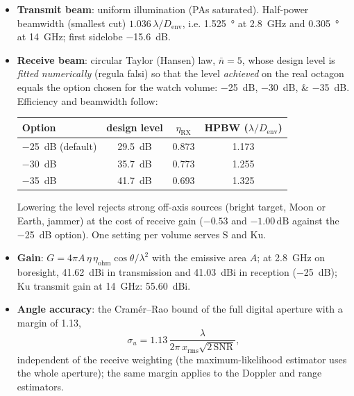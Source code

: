 \documentclass[11pt,a4paper]{article}
\newcommand{\dB}{\,\mathrm{dB}}
\newcommand{\SNR}{\mathrm{SNR}}
\newcommand{\Denv}{D_{\mathrm{env}}}
\begin{document}
\begin{itemize}
  \item \textbf{Transmit beam}: uniform illumination (PAs saturated). Half-power beamwidth (smallest cut)
        $1.036\,\lambda/\Denv$, i.e. \SI{1.525}{\degree} at \SI{2.8}{GHz} and \SI{0.305}{\degree} at \SI{14}{GHz};
        first sidelobe \SI{-15.6}{dB}.
  \item \textbf{Receive beam}: circular Taylor (Hansen) law, $\bar n = 5$, whose design level is \emph{fitted
        numerically} (regula falsi) so that the level \emph{achieved} on the real octagon equals the option chosen for
        the watch volume: \SIlist{-25;-30;-35}{dB}. Efficiency and beamwidth follow:
        \begin{center}
        \begin{tabular}{@{}lccc@{}}
        \toprule
        Option & design level & $\eta_{\mathrm{RX}}$ & HPBW ($\lambda/\Denv$)\\
        \midrule
        \SI{-25}{dB} (default) & \SI{29.5}{dB} & 0.873 & 1.173\\
        \SI{-30}{dB} & \SI{35.7}{dB} & 0.773 & 1.255\\
        \SI{-35}{dB} & \SI{41.7}{dB} & 0.693 & 1.325\\
        \bottomrule
        \end{tabular}
        \end{center}
        Lowering the level rejects strong off-axis sources (bright target, Moon or Earth, jammer) at the cost of receive
        gain ($-0.53$ and $-1.00\dB$ against the \SI{-25}{dB} option). One setting per volume serves S and Ku.
  \item \textbf{Gain}: $G = 4\pi A\,\eta\,\eta_{\mathrm{ohm}}\cos\theta/\lambda^2$ with the emissive area $A$; at
        \SI{2.8}{GHz} on boresight, \SI{41.62}{dBi} in transmission and \SI{41.03}{dBi} in reception (\SI{-25}{dB});
        Ku transmit gain at \SI{14}{GHz}: \SI{55.60}{dBi}.
  \item \textbf{Angle accuracy}: the Cram\'er--Rao bound of the full digital aperture with a margin of 1.13,
        \[ \sigma_u = 1.13\,\frac{\lambda}{2\pi\,x_{\mathrm{rms}}\sqrt{2\,\SNR}}, \]
        independent of the receive weighting (the maximum-likelihood estimator uses the whole aperture); the same
        margin applies to the Doppler and range estimators.
\end{itemize}
\end{document}
